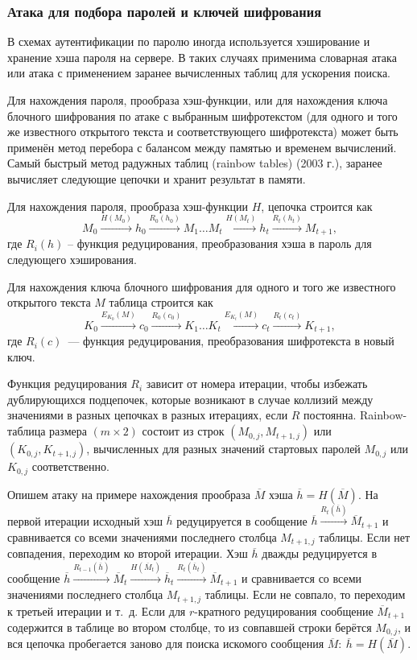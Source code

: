 \documentclass[10pt,a4paper,openany]{book}
\begin{document}
\subsubsection{Атака для подбора паролей и ключей шифрования}

В схемах аутентификации по паролю иногда используется хэширование и хранение хэша пароля на сервере. В таких случаях применима словарная атака или атака с применением заранее вычисленных таблиц для ускорения поиска.

Для нахождения пароля, прообраза хэш-функции, или для нахождения ключа блочного шифрования по атаке с выбранным шифротекстом (для одного и того же известного открытого текста и соответствующего шифротекста) может быть применён метод перебора с балансом между памятью и временем вычислений. Самый быстрый метод радужных таблиц (rainbow tables) (2003 г.), заранее вычисляет следующие цепочки и хранит результат в памяти.

Для нахождения пароля, прообраза хэш-функции $H$, цепочка строится как
    \[ M_0 \xrightarrow{H(M_0)} h_0 \xrightarrow{R_0(h_0)} M_1 \ldots M_t \xrightarrow{H(M_t)} h_t \xrightarrow{R_t(h_t)} M_{t+1}, \]
где $R_i(h)$ -- функция редуцирования, преобразования хэша в пароль для следующего хэширования.

Для нахождения ключа блочного шифрования для одного и того же известного открытого текста $M$ таблица строится как
    \[ K_0 \xrightarrow{E_{K_0}(M)} c_0 \xrightarrow{R_0(c_0)} K_1 \ldots K_t \xrightarrow{E_{K_t}(M)} c_t \xrightarrow{R_t(c_t)} K_{t+1}, \]
где $R_i(c)$~--- функция редуцирования, преобразования шифротекста в новый ключ.

Функция редуцирования $R_i$ зависит от номера итерации, чтобы избежать дублирующихся подцепочек, которые возникают в случае коллизий между значениями в разных цепочках в разных итерациях, если $R$ постоянна. Rainbow-таблица размера $(m \times 2)$ состоит из строк $(M_{0,j}, M_{t+1,j})$ или $(K_{0,j}, K_{t+1,j})$, вычисленных для разных значений стартовых паролей $M_{0,j}$ или $K_{0,j}$ соответственно.

Опишем атаку на примере нахождения прообраза $\overline{M}$ хэша $\overline{h} = H(\overline{M})$. На первой итерации исходный хэш $\overline{h}$ редуцируется в сообщение $\overline{h} \xrightarrow{R_t(\overline{h})} \overline{M}_{t+1} $ и сравнивается со всеми значениями последнего столбца $M_{t+1,j}$ таблицы. Если нет совпадения, переходим ко второй итерации. Хэш $\overline{h}$ дважды редуцируется в сообщение $\overline{h} \xrightarrow{R_{t-1}(\overline{h})} \overline{M}_t \xrightarrow{H(\overline{M}_t)} \overline{h}_t \xrightarrow{R_t(\overline{h}_t)} \overline{M}_{t+1}$ и сравнивается со всеми значениями последнего столбца $M_{t+1,j}$ таблицы. Если не совпало, то переходим к третьей итерации и т.~д. Если для $r$-кратного редуцирования сообщение $\overline{M}_{t+1}$ содержится в таблице во втором столбце, то из совпавшей строки берётся $M_{0,j}$, и вся цепочка пробегается заново для поиска искомого сообщения $\overline{M}: ~ \overline{h} = H(\overline{M})$.
\end{document}
